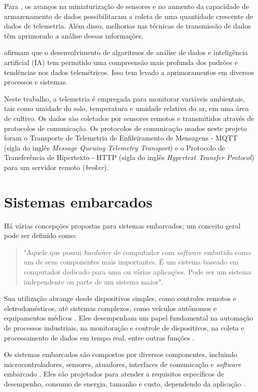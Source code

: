 Para \textcite{Lizhuang_telemetry2021}, os avanços na miniaturização de sensores e no aumento da capacidade de armazenamento de dados possibilitaram a coleta de uma quantidade crescente de dados de telemetria. Além disso, melhorias nas técnicas de transmissão de dados têm aprimorado a análise dessas informações. 

\textcite{Ding_telemetry2017} afirmam que o desenvolvimento de algoritmos de análise de dados e inteligência artificial (IA) tem permitido uma compreensão mais profunda dos padrões e tendências nos dados telemétricos. Isso tem levado a aprimoramentos em diversos processos e sistemas.

Neste trabalho, a telemetria é empregada para monitorar variáveis ambientais, tais como umidade do solo, temperatura e umidade relativa do ar, em uma área de cultivo.  Os dados são coletados por sensores remotos e transmitidos através de protocolos de comunicação. Os protocolos de comunicação usados neste projeto foram o Transporte de Telemetria de Enfileiramento de Mensagens - MQTT (sigla do inglês \textit{Message Queuing Telemetry Transport}) e o Protocolo de Transferência de Hipertexto - HTTP (sigla do inglês \textit{Hypertext Transfer Protocol}) para um servidor remoto (\textit{broker}).

\section{Sistemas embarcados}
Há várias concepções propostas para sistemas embarcados; um conceito geral pode ser definido como:

\begin{quote}
"Aquele que possui \textit{hardware} de computador com \textit{software} embutido como um de seus componentes mais importantes. É um sistema baseado em computador dedicado para uma ou várias aplicações. Pode ser um sistema independente ou parte de um sistema maior". \parencite[{p. 39}]{dutta2014comprehensive}
\end{quote}

Sua utilização abrange desde dispositivos simples, como controles remotos e eletrodomésticos, até sistemas complexos, como veículos autônomos e equipamentos médicos \parencite{lee2008cyber, kato2018autoware}. Eles desempenham um papel fundamental na automação de processos industriais, na monitoração e controle de dispositivos, na coleta e processamento de dados em tempo real, entre outras funções \parencite{dutta2014comprehensive}.

Os sistemas embarcados são compostos por diversos componentes, incluindo microcontroladores, sensores, atuadores, interfaces de comunicação e \textit{software} embarcado \parencite{lee2008cyber}.
Eles são projetados para atender a requisitos específicos de desempenho, consumo de energia, tamanho e custo, dependendo da aplicação \parencite{Mazid_microcontrolador2011}.

